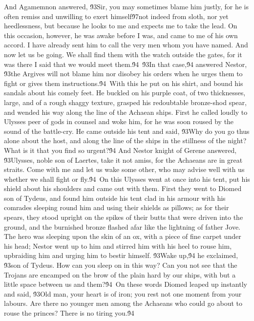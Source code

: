 {And Agamemnon answered, \'93Sir, you may sometimes blame him justly, for he is often remiss and unwilling to exert himself\'97not indeed from sloth, nor yet heedlessness, but because he looks to me and expects me to take the lead. On this occasion, however, he was awake before I was, and came to me of his own accord. I have already sent him to call the very men whom you have named. And now let us be going. We shall find them with the watch outside the gates, for it was there I said that we would meet them.\'94\
\'93In that case,\'94 answered Nestor, \'93the Argives will not blame him nor disobey his orders when he urges them to fight or gives them instructions.\'94\
With this he put on his shirt, and bound his sandals about his comely feet. He buckled on his purple coat, of two thicknesses, large, and of a rough shaggy texture, grasped his redoubtable bronze-shod spear, and wended his way along the line of the Achaean ships. First he called loudly to Ulysses peer of gods in counsel and woke him, for he was soon roused by the sound of the battle-cry. He came outside his tent and said, \'93Why do you go thus alone about the host, and along the line of the ships in the stillness of the night? What is it that you find so urgent?\'94 And Nestor knight of Gerene answered, \'93Ulysses, noble son of Laertes, take it not amiss, for the Achaeans are in great straits. Come with me and let us wake some other, who may advise well with us whether we shall fight or fly.\'94\
On this Ulysses went at once into his tent, put his shield about his shoulders and came out with them. First they went to Diomed son of Tydeus, and found him outside his tent clad in his armour with his comrades sleeping round him and using their shields as pillows; as for their spears, they stood upright on the spikes of their butts that were driven into the ground, and the burnished bronze flashed afar like the lightning of father Jove. The hero was sleeping upon the skin of an ox, with a piece of fine carpet under his head; Nestor went up to him and stirred him with his heel to rouse him, upbraiding him and urging him to bestir himself. \'93Wake up,\'94 he exclaimed, \'93son of Tydeus. How can you sleep on in this way? Can you not see that the Trojans are encamped on the brow of the plain hard by our ships, with but a little space between us and them?\'94\
On these words Diomed leaped up instantly and said, \'93Old man, your heart is of iron; you rest not one moment from your labours. Are there no younger men among the Achaeans who could go about to rouse the princes? There is no tiring you.\'94\
}
